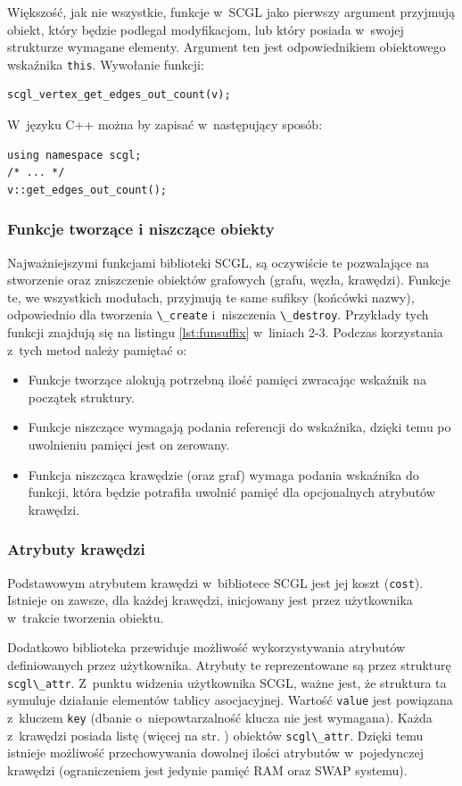 \documentclass[a4paper,12pt,polish,twoside,openright]{thesis}
\newcommand\code[1]{\lstinline[style=line]{#1}}
\begin{document}
Większość, jak nie wszystkie, funkcje w~SCGL jako pierwszy argument przyjmują obiekt, który będzie podlegał modyfikacjom, lub który posiada w~swojej strukturze wymagane elementy.
Argument ten jest odpowiednikiem obiektowego wskaźnika \code{this}.
Wywołanie funkcji:
\begin{lstlisting}[style=coden]
scgl_vertex_get_edges_out_count(v);
\end{lstlisting}
W~języku C++ można by zapisać w~następujący sposób:
\begin{lstlisting}[style=coden]
using namespace scgl;
/* ... */
v::get_edges_out_count();
\end{lstlisting}

\subsubsection*{Funkcje tworzące i niszczące obiekty}
Najważniejszymi funkcjami biblioteki SCGL, są oczywiście te pozwalające na stworzenie oraz zniszczenie obiektów grafowych (grafu, węzła, krawędzi).
Funkcje te, we wszystkich modułach, przyjmują te same sufiksy (końcówki nazwy), odpowiednio dla tworzenia \code{\_create} i~niszczenia \code{\_destroy}.
Przykłady tych funkcji znajdują się na listingu \ref{lst:funsuffix} w~liniach 2-3. Podczas korzystania z~tych metod należy pamiętać o:
\begin{itemize}
	\item Funkcje tworzące alokują potrzebną ilość pamięci zwracając wskaźnik na początek struktury.
	\item Funkcje niszczące wymagają podania referencji do wskaźnika, dzięki temu po uwolnieniu pamięci jest on zerowany.
	\item Funkcja niszcząca krawędzie (oraz graf) wymaga podania wskaźnika do funkcji, która będzie potrafiła uwolnić pamięć dla opcjonalnych atrybutów krawędzi.
\end{itemize}

\subsubsection*{Atrybuty krawędzi}
Podstawowym atrybutem krawędzi w~bibliotece SCGL jest jej koszt (\code{cost}).
Istnieje on zawsze, dla każdej krawędzi, inicjowany jest przez użytkownika w~trakcie tworzenia obiektu.

Dodatkowo biblioteka przewiduje możliwość wykorzystywania atrybutów definiowanych przez użytkownika.
Atrybuty te reprezentowane są przez strukturę \code{scgl\_attr}.
Z~punktu widzenia użytkownika SCGL, ważne jest, że struktura ta symuluje działanie elementów tablicy asocjacyjnej.
Wartość \code{value} jest powiązana z~kluczem \code{key} (dbanie o~niepowtarzalność klucza nie jest wymagana).
Każda z~krawędzi posiada listę (więcej na str. \pageref{chap:lists}) obiektów \code{scgl\_attr}.
Dzięki temu istnieje możliwość przechowywania dowolnej ilości atrybutów w~pojedynczej krawędzi (ograniczeniem jest jedynie pamięć RAM oraz SWAP systemu).
\end{document}
